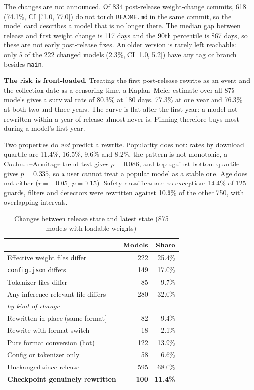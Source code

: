 \documentclass[conference]{IEEEtran}
\newcommand{\code}[1]{\texttt{#1}}
\begin{document}
The changes are not announced. Of 834 post-release weight-change commits, 618 (74.1\%, CI [71.0, 77.0]) do not touch \code{README.md} in the same commit, so the model card describes a model that is no longer there. The median gap between release and first weight change is 117 days and the 90th percentile is 867 days, so these are not early post-release fixes. An older version is rarely left reachable: only 5 of the 222 changed models (2.3\%, CI [1.0, 5.2]) have any tag or branch besides \code{main}.

\textbf{The risk is front-loaded.} Treating the first post-release rewrite as an event and the collection date as a censoring time, a Kaplan--Meier estimate over all 875 models gives a survival rate of 80.3\% at 180 days, 77.3\% at one year and 76.3\% at both two and three years. The curve is flat after the first year: a model not rewritten within a year of release almost never is. Pinning therefore buys most during a model's first year.

Two properties do \emph{not} predict a rewrite. Popularity does not: rates by download quartile are 11.4\%, 16.5\%, 9.6\% and 8.2\%, the pattern is not monotonic, a Cochran--Armitage trend test gives $p = 0.086$, and top against bottom quartile gives $p = 0.335$, so a user cannot treat a popular model as a stable one. Age does not either ($r = -0.05$, $p = 0.15$). Safety classifiers are no exception: 14.4\% of 125 guards, filters and detectors were rewritten against 10.9\% of the other 750, with overlapping intervals.

\begin{table}[t]
\caption{Changes between release state and latest state (875 models with loadable weights)}
\label{tab:prev}
\centering
\footnotesize
\begin{tabular}{lrr}
\toprule
 & Models & Share \\
\midrule
Effective weight files differ & 222 & 25.4\% \\
\code{config.json} differs & 149 & 17.0\% \\
Tokenizer files differ & 85 & 9.7\% \\
Any inference-relevant file differs & 280 & 32.0\% \\
\midrule
\multicolumn{3}{l}{\emph{by kind of change}} \\
Rewritten in place (same format) & 82 & 9.4\% \\
Rewrite with format switch & 18 & 2.1\% \\
Pure format conversion (bot) & 122 & 13.9\% \\
Config or tokenizer only & 58 & 6.6\% \\
Unchanged since release & 595 & 68.0\% \\
\midrule
\textbf{Checkpoint genuinely rewritten} & \textbf{100} & \textbf{11.4\%} \\
\bottomrule
\end{tabular}
\end{table}
\end{document}

